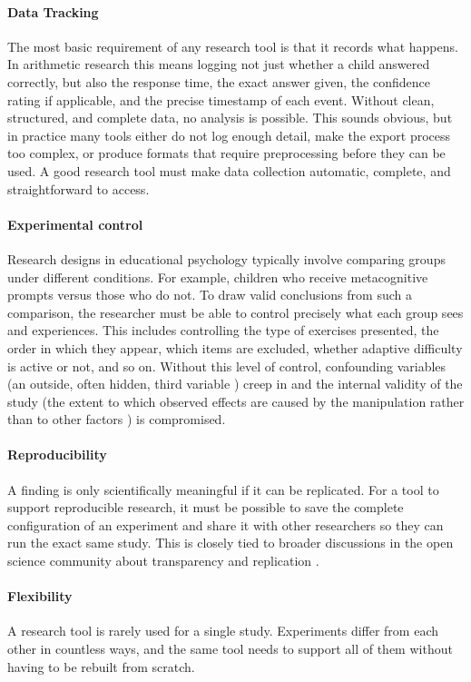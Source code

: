 \paragraph{Data Tracking}
The most basic requirement of any research tool is that it records what happens. In arithmetic research this means logging not just whether a child answered correctly, but also the response time, the exact answer given, the confidence rating if applicable, and the precise timestamp of each event. Without clean, structured, and complete data, no analysis is possible. This sounds obvious, but in practice many tools either do not log enough detail, make the export process too complex, or produce formats that require preprocessing before they can be used. A good research tool must make data collection automatic, complete, and straightforward to access.

\paragraph{Experimental control}
Research designs in educational psychology typically involve comparing groups under different conditions. For example, children who receive metacognitive prompts versus those who do not. To draw valid conclusions from such a comparison, the researcher must be able to control precisely what each group sees and experiences. This includes controlling the type of exercises presented, the order in which they appear, which items are excluded, whether adaptive difficulty is active or not, and so on. Without this level of control, confounding variables (an outside, often hidden, third variable \cite{salkind2010encyclopedia}) creep in and the internal validity of the study (the extent to which observed effects are caused by the manipulation rather than to other factors \cite{campbell1963experimental}) is compromised.

\paragraph{Reproducibility}
A finding is only scientifically meaningful if it can be replicated. For a tool to support reproducible research, it must be possible to save the complete configuration of an experiment and share it with other researchers so they can run the exact same study. This is closely tied to broader discussions in the open science community about transparency and replication \cite{opensciencecollaboration2015}.

\paragraph{Flexibility}
A research tool is rarely used for a single study. Experiments differ from each other in countless ways, and the same tool needs to support all of them without having to be rebuilt from scratch.

